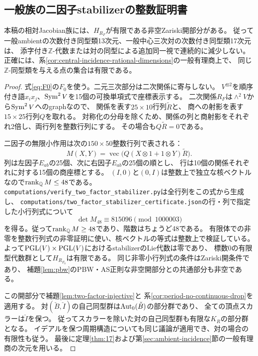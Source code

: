 \subsection{一般族の二因子stabilizerの整数証明書}
\begin{theorem}[一般ambientの有限な二因子stabilizer]\label{thm:generic-two-factor-finite}
本稿の相対Jacobian族には、$H_{R_F}$が有限である非空Zariski開部分がある。
従って一般ambientの次数付き同型類13次元、一般中心三次対の次数付き同型類17次元は、
添字付き$\mathbb Z$-代数または対の同型による追加同一視で連続的に減少しない。
正確には、系\ref{cor:central-incidence-rational-dimensions}の一般有理商上で、
同じ$\mathbb Z$-同型類を与える点の集合は有限である。
\end{theorem}
\begin{proof}
式\eqref{eq:F0}の$F_0$を使う。二元三次部分は二次関係に寄与しない。
$V^{\otimes2}$を順序付き語$x_ix_j$、$\operatorname{Sym}^2V$を15個の可換単項式で座標表示する。
二次関係$R_F$は$\wedge^2V$から$\operatorname{Sym}^2V$へのgraphなので、
関係を表す$25\times10$行列$\widetilde R$と、
商への射影を表す$15\times25$行列$Q$を取れる。
対称化の分母を除くため、関係の列と商射影をそれぞれ2倍し、両行列を整数行列にする。
その場合も$Q\widetilde R=0$である。

二因子の無限小作用は次の$150\times50$整数行列で表される：
\begin{equation}\label{eq:two-factor-lie-matrix}
 M(X,Y)=\operatorname{vec}
       \bigl(Q(X\otimes1+1\otimes Y)\widetilde R\bigr).
\end{equation}
列は左因子$E_{ab}$の25個、次に右因子$E_{ab}$の25個の順とし、
行は10個の関係それぞれに対する15個の商座標とする。
$(I,0)$と$(0,I)$は整数上で独立な核ベクトルなので$\operatorname{rank}_{\mathbb Q}M\le48$である。
\nolinkurl{computations/verify_two_factor_stabilizer.py}は全行列をこの式から生成し、
\nolinkurl{computations/two_factor_stabilizer_certificate.json}の行・列で指定した小行列式について
\begin{equation}\label{eq:two-factor-nonzero-minor}
 \det M_{48}\equiv815096\pmod{1000003}
\end{equation}
を得る。従って$\operatorname{rank}_{\mathbb Q}M\ge48$であり、階数はちょうど48である。
有限体での非零を整数行列式の非零証明に使い、核ベクトルの等式は整数上で検証している。
よって$\mathrm{PGL}(V)\times\mathrm{PGL}(V)$におけるstabilizerのLie代数は零であり、
標数0の有限型代数群として$H_{R_{F_0}}$は有限である。
同じ非零小行列式の条件はZariski開条件であり、
補題\ref{lem:pbw}のPBW・AS正則な非空開部分との共通部分も非空である。

この開部分で補題\ref{lem:two-factor-injective}と
系\ref{cor:period-no-continuous-drop}を適用する。
対$(\check B,\check I)$の自己同型群は$\operatorname{Aut}_0(\check B)$の部分群であり、
全ての頂点スカラーは$\check I$を保つ。
従ってスカラーを除いた対の自己同型群も有限な$K_R$の部分群となる。
イデアルを保つ周期構造についても同じ議論が適用でき、対の場合の有限性も従う。
最後に定理\ref{thm:17}および第\ref{sec:ambient-incidence}節の一般有理商の次元を用いる。
\end{proof}

